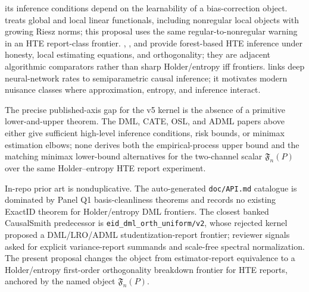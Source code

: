 \documentclass[11pt]{article}
\theoremstyle{definition}
\theoremstyle{plain}
\theoremstyle{remark}
\begin{document}
its inference conditions depend on the learnability of a bias-correction object.
\citet{ChernozhukovNeweySingh2022Riesz} treats global and local linear
functionals, including nonregular local objects with growing Riesz norms; this
proposal uses the same regular-to-nonregular warning in an HTE report-class
frontier.
\citet{WagerAthey2018CausalForests}, \citet{AtheyTibshiraniWager2019GRF}, and
\citet{OprescuSyrgkanisWu2019ORF} provide forest-based HTE inference under
honesty, local estimating equations, and orthogonality; they are adjacent
algorithmic comparators rather than sharp Holder/entropy iff frontiers.
\citet{FarrellLiangMisra2021DNNInference} links deep neural-network rates to
semiparametric causal inference; it motivates modern nuisance classes where
approximation, entropy, and inference interact.

The precise published-axis gap for the v5 kernel is the absence of a primitive
lower-and-upper theorem.  The DML, CATE, OSL, and ADML papers above either give
sufficient high-level inference conditions, risk bounds, or minimax estimation
elbows; none derives both the empirical-process upper bound and the matching
minimax lower-bound alternatives for the two-channel scalar
\(\mathfrak{F}_n(P)\) over the same Holder--entropy HTE report experiment.

In-repo prior art is nonduplicative.  The auto-generated \texttt{doc/API.md}
catalogue is dominated by Panel Q1 basis-cleanliness theorems and records no
existing ExactID theorem for Holder/entropy DML frontiers.  The closest banked
CausalSmith predecessor is \texttt{eid\_dml\_orth\_uniform/v2}, whose rejected
kernel proposed a DML/LRO/ADML studentization-report frontier; reviewer signals
asked for explicit variance-report summands and scale-free spectral
normalization.  The present proposal changes the object from estimator-report
equivalence to a Holder/entropy first-order orthogonality breakdown frontier
for HTE reports, anchored by the named object \(\mathfrak{F}_n(P)\).
\end{document}
